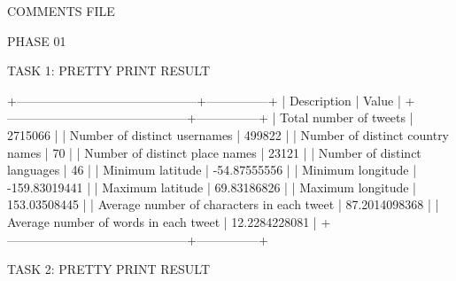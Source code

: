 
COMMENTS FILE

PHASE 01

TASK 1: PRETTY PRINT RESULT

+--------------------------------------------+---------------+
|                Description                 |     Value     |
+--------------------------------------------+---------------+
|           Total number of tweets           |    2715066    |
|        Number of distinct usernames        |     499822    |
|      Number of distinct country names      |       70      |
|       Number of distinct place names       |     23121     |
|        Number of distinct languages        |       46      |
|              Minimum latitude              |  -54.87555556 |
|             Minimum longitude              | -159.83019441 |
|              Maximum latitude              |  69.83186826  |
|             Maximum longitude              |  153.03508445 |
| Average number of characters in each tweet | 87.2014098368 |
|   Average number of words in each tweet    | 12.2284228081 |
+--------------------------------------------+---------------+


TASK 2: PRETTY PRINT RESULT

